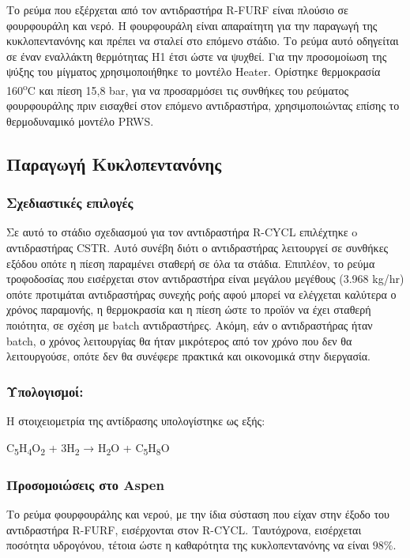 \documentclass[11pt]{article}
\begin{document}
Το ρεύμα που εξέρχεται από τον αντιδραστήρα R-FURF είναι πλούσιο σε
φουρφουράλη και νερό. Η φουρφουράλη είναι απαραίτητη για την παραγωγή
της κυκλοπεντανόνης και πρέπει να σταλεί στο επόμενο στάδιο. Το ρεύμα
αυτό οδηγείται σε έναν εναλλάκτη θερμότητας Η1 έτσι ώστε να ψυχθεί. Για
την προσομοίωση της ψύξης του μίγματος χρησιμοποιήθηκε το μοντέλο
Heater. Ορίστηκε θερμοκρασία 160\textsuperscript{o}C και πίεση 15,8 bar, για να
προσαρμόσει τις συνθήκες του ρεύματος φουρφουράλης πριν εισαχθεί στον
επόμενο αντιδραστήρα, χρησιμοποιώντας επίσης το θερμοδυναμικό μοντέλο
PRWS.

\subsection{Παραγωγή Κυκλοπεντανόνης}
\label{sec:org53a5a9a}
\subsubsection{Σχεδιαστικές επιλογές}
\label{sec:org018a011}
Σε αυτό το στάδιο σχεδιασμού για τον αντιδραστήρα R-CYCL επιλέχτηκε o
αντιδραστήρας CSTR. Αυτό συνέβη διότι ο αντιδραστήρας λειτουργεί σε
συνθήκες εξόδου οπότε η πίεση παραμένει σταθερή σε όλα τα στάδια.
Επιπλέον, το ρεύμα τροφοδοσίας που εισέρχεται στον αντιδραστήρα είναι
μεγάλου μεγέθους (3.968 kg/hr) οπότε προτιμάται αντιδραστήρας συνεχής
ροής αφού μπορεί να ελέγχεται καλύτερα ο χρόνος παραμονής, η θερμοκρασία
και η πίεση ώστε το προϊόν να έχει σταθερή ποιότητα, σε σχέση με batch
αντιδραστήρες. Ακόμη, εάν ο αντιδραστήρας ήταν batch, ο χρόνος
λειτουργίας θα ήταν μικρότερος από τον χρόνο που δεν θα λειτουργούσε,
οπότε δεν θα συνέφερε πρακτικά και οικονομικά στην διεργασία.

\subsubsection{Υπολογισμοί:}
\label{sec:orgf67f2fd}
Η στοιχειομετρία της αντίδρασης υπολογίστηκε ως εξής:

C\textsubscript{5}H\textsubscript{4}O\textsubscript{2} + 3H\textsubscript{2} → H\textsubscript{2}O + C\textsubscript{5}H\textsubscript{8}O

\subsubsection{Προσομοιώσεις στο Aspen}
\label{sec:org76dde2e}
Το ρεύμα φουρφουράλης και νερού, με την ίδια σύσταση που είχαν στην
έξοδο του αντιδραστήρα R-FURF, εισέρχονται στον R-CYCL. Ταυτόχρονα,
εισέρχεται ποσότητα υδρογόνου, τέτοια ώστε η καθαρότητα της κυκλοπεντανόνης
να είναι \(98 \%\).
\end{document}

